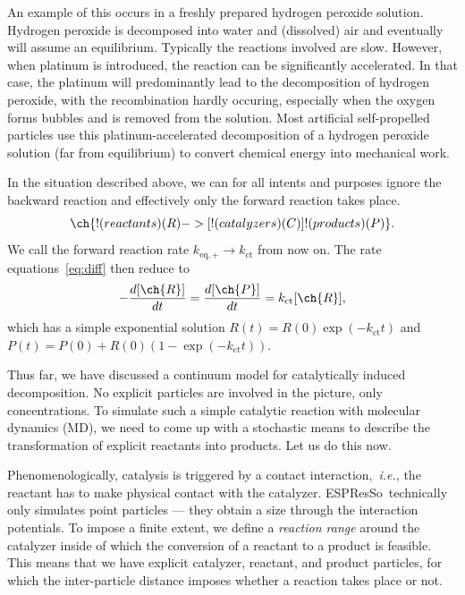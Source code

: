 \documentclass[aip,jcp,reprint,a4paper,onecolumn,nofootinbib,amsmath,amssymb]{revtex4-1}
\newcommand{\es}{\mbox{\textsf{ESPResSo}}\xspace}
\begin{document}
An example of this occurs in a freshly prepared hydrogen peroxide solution. Hydrogen peroxide is decomposed into water and (dissolved) air and eventually will assume an equilibrium. Typically the reactions involved are slow. However, when platinum is introduced, the reaction can be significantly accelerated. In that case, the platinum will predominantly lead to the decomposition of hydrogen peroxide, with the recombination hardly occuring, especially when the oxygen forms bubbles and is removed from the solution. Most artificial self-propelled particles use this platinum-accelerated decomposition of a hydrogen peroxide solution (far from equilibrium) to convert chemical energy into mechanical work.  

In the situation described above, we can for all intents and purposes ignore the backward reaction and effectively only the forward reaction takes place.
\begin{equation}
  \label{eq:cat}
  \ch{!(reactants)(R) ->[ !(catalyzers)(C) ] !(products)(P)} .
\end{equation}
We call the forward reaction rate $k_{\text{eq},+} \to k_{\text{ct}}$ from now on. The rate equations~\eqref{eq:diff} then reduce to
\begin{equation}
  \label{eq:diff-cat}
  -\frac{d[\ch{R}]}{dt} = \frac{d[\ch{P}]}{dt} = k_{\text{ct}}[\ch{R}] ,
\end{equation}
which has a simple exponential solution $R(t) = R(0)\exp(- k_{\text{ct}} t)$ and $P(t) = P(0) + R(0)(1 - \exp(- k_{\text{ct}} t))$.

Thus far, we have discussed a continuum model for catalytically induced decomposition. No explicit particles are involved in the picture, only concentrations. To simulate such a simple catalytic reaction with molecular dynamics (MD), we need to come up with a stochastic means to describe the transformation of explicit reactants into products. Let us do this now.

Phenomenologically, catalysis is triggered by a contact interaction,~\textit{i.e.}, the reactant has to make physical contact with the catalyzer. \es\ technically only simulates point particles --- they obtain a size through the interaction potentials. To impose a finite extent, we define a \textit{reaction range} around the catalyzer inside of which the conversion of a reactant to a product is feasible. This means that we have explicit catalyzer, reactant, and product particles, for which the inter-particle distance imposes whether a reaction takes place or not.
\end{document}
